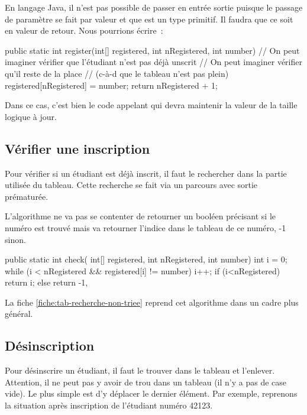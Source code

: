 			En langage Java, il n'est pas possible de passer  en 
			entrée sortie puisque le passage de paramètre se fait par valeur et 
			que  est un type primitif. Il faudra que ce soit en valeur de 
			retour. Nous pourrions écrire~:

			\begin{java}
	public static int register(int[] registered, int nRegistered,
			int number){
		// On peut imaginer vérifier que l'étudiant n'est pas déjà unscrit
		// On peut imaginer vérifier qu'il reste de la place
		// (c-à-d que le tableau n'est pas plein)
		registered[nRegistered] = number;
		return nRegistered + 1;
	}
			\end{java}

			Dans ce cas, c'est bien le code appelant qui devra maintenir la 
			valeur de la taille logique à jour. 
		
		\subsection{Vérifier une inscription}
	
			Pour vérifier si un étudiant est déjà inscrit,
			il faut le rechercher dans la partie utilisée du tableau.
			Cette recherche se fait via un parcours avec sortie
			prématurée. 
			
			L'algorithme ne va pas se contenter de retourner un booléen
			précisant si le numéro est trouvé mais va retourner l'indice dans le
			tableau de ce numéro, -1 sinon. 

			\begin{java}
public static int check(
	int[] registered,
	int nRegistered,
	int number){
		int i = 0;
		while (i < nRegistered && registered[i] != number){
			i++;
		}
		if (i<nRegistered){
			return i;
		} else {
			return -1,
		}
}
			\end{java}
			
			La fiche \vref{fiche:tab-recherche-non-triee} reprend cet algorithme
			dans un cadre plus général.

		\subsection{Désinscription}
		
			Pour désinscrire un étudiant, il faut le trouver dans le tableau et
			l’enlever.  Attention, il ne peut pas y avoir de trou dans un
			tableau (il n’y a pas de case vide).  Le plus simple est d’y
			déplacer le dernier élément.  Par exemple, reprenons la situation
			après inscription de l’étudiant numéro 42123.

